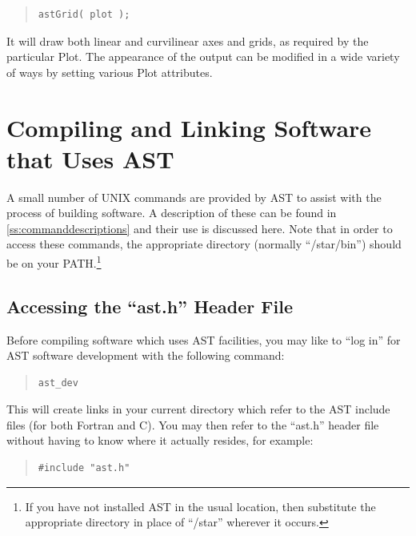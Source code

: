 \documentclass[twoside,11pt]{article}
\newcommand{\appref}[1]{Appendix~\ref{#1}}
\renewcommand{\appref}[1]{\ref{#1}}
\begin{document}
\begin{quote}
\small
\begin{verbatim}
astGrid( plot );
\end{verbatim}
\normalsize
\end{quote}

It will draw both linear and curvilinear axes and grids, as required
by the particular Plot. The appearance of the output can be modified
in a wide variety of ways by setting various Plot attributes.

\cleardoublepage
\section{Compiling and Linking Software that Uses AST}

A small number of UNIX commands are provided by AST to assist with the
process of building software. A description of these can be found in
\appref{ss:commanddescriptions} and their use is discussed here.  Note
that in order to access these commands, the appropriate directory
(normally ``/star/bin'') should be on your PATH.\footnote{If you have
not installed AST in the usual location, then substitute the
appropriate directory in place of ``/star'' wherever it occurs.}

\subsection{\label{ss:accessingheaderfile}Accessing the ``ast.h'' Header File}

Before compiling software which uses AST facilities, you may like to
``log in'' for AST software development with the following command:

\begin{quote}
\small
\begin{verbatim}
ast_dev
\end{verbatim}
\normalsize
\end{quote}

This will create links in your current directory which refer to the
AST include files (for both Fortran and C).
You may then refer to the ``ast.h'' header file without having to know
where it actually resides, for example:

\begin{quote}
\small
\begin{verbatim}
#include "ast.h"
\end{verbatim}
\normalsize
\end{quote}
\end{document}
